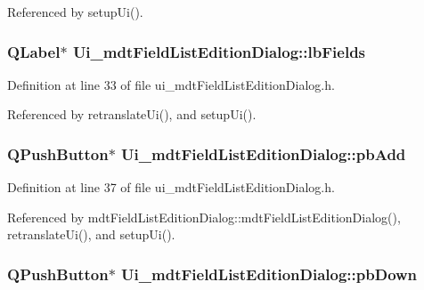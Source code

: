 Referenced by setup\-Ui().

\hypertarget{class_ui__mdt_field_list_edition_dialog_aaa32a5c19424edcc47eb0939e7268f45}{
\subsubsection[{lb\-Fields}]{\setlength{\rightskip}{0pt plus 5cm}Q\-Label$\ast$ Ui\-\_\-mdt\-Field\-List\-Edition\-Dialog\-::lb\-Fields}}\label{class_ui__mdt_field_list_edition_dialog_aaa32a5c19424edcc47eb0939e7268f45}


Definition at line 33 of file ui\-\_\-mdt\-Field\-List\-Edition\-Dialog.\-h.



Referenced by retranslate\-Ui(), and setup\-Ui().

\hypertarget{class_ui__mdt_field_list_edition_dialog_a98c057b1d437b4000da90eacacdc8f5f}{
\subsubsection[{pb\-Add}]{\setlength{\rightskip}{0pt plus 5cm}Q\-Push\-Button$\ast$ Ui\-\_\-mdt\-Field\-List\-Edition\-Dialog\-::pb\-Add}}\label{class_ui__mdt_field_list_edition_dialog_a98c057b1d437b4000da90eacacdc8f5f}


Definition at line 37 of file ui\-\_\-mdt\-Field\-List\-Edition\-Dialog.\-h.



Referenced by mdt\-Field\-List\-Edition\-Dialog\-::mdt\-Field\-List\-Edition\-Dialog(), retranslate\-Ui(), and setup\-Ui().

\hypertarget{class_ui__mdt_field_list_edition_dialog_ab2231075e4b0d03e0d3e6549fe58efa8}{
\subsubsection[{pb\-Down}]{\setlength{\rightskip}{0pt plus 5cm}Q\-Push\-Button$\ast$ Ui\-\_\-mdt\-Field\-List\-Edition\-Dialog\-::pb\-Down}}\label{class_ui__mdt_field_list_edition_dialog_ab2231075e4b0d03e0d3e6549fe58efa8}


